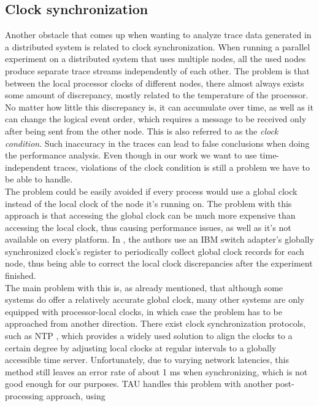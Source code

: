 \subsection{Clock synchronization}
\label{sec:clock_synch}
Another obstacle that comes up when wanting to analyze trace data
generated in a distributed system is related to clock
synchronization. When running a parallel experiment on a distributed
system that uses multiple nodes, all the used nodes produce separate
trace streams independently of each other. The problem is that between
the local processor clocks of different nodes, there almost always exists
some amount of discrepancy, mostly related to the temperature
of the processor. No matter how little this discrepancy is,
it can accumulate over time, as well as it can change the logical
event order, which requires a message to be received only after being
sent from the other node. This is also referred to as the \emph{clock
condition}.\cite{wbswpclg00}\cite{brwl09} Such inaccuracy in the traces
can lead to false conclusions when doing the performance
analysis. Even though in our work we want to use time-independent
traces, violations of the clock condition is still a problem we have
to be able to handle.\\
The problem could be easily avoided if every process would use a
global clock instead of the local clock of the node it's running
on. The problem with this approach is that accessing the global clock
can be much more expensive than accessing the local clock, thus
causing performance issues, as well as it's not available on every
platform. In \cite{wbswpclg00}, the authors use an IBM switch
adapter's globally synchronized clock's register to periodically
collect global clock records for each node, thus being able to correct
the local clock discrepancies after the experiment finished.\\
The main problem with this is, as already mentioned, that although
some systems do offer a relatively
accurate global clock, many other systems are only equipped with
processor-local clocks, in which case the problem has to be approached
from another direction. There exist clock synchronization protocols,
such as NTP \cite{m92}, which provides a widely used solution to align
the clocks to a certain degree by adjusting local clocks at regular
intervals to a globally accessible time server. Unfortunately, due to
varying network latencies, this method still leaves an error rate
of about 1 ms when synchronizing, which is not good enough for our
purposes.
TAU handles this problem with another post-processing approach, using
